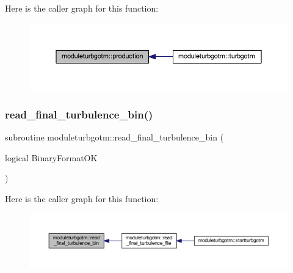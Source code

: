 Here is the caller graph for this function\+:\nopagebreak
\begin{figure}[H]
\begin{center}
\leavevmode
\includegraphics[width=350pt]{namespacemoduleturbgotm_a67c6b885be20c57ed033df6706d9adab_icgraph}
\end{center}
\end{figure}
\mbox{\label{namespacemoduleturbgotm_ad942836f5c266b4ce7d03ca96fdf696a}} 
\subsubsection{\texorpdfstring{read\+\_\+final\+\_\+turbulence\+\_\+bin()}{read\_final\_turbulence\_bin()}}
{\footnotesize\ttfamily subroutine moduleturbgotm\+::read\+\_\+final\+\_\+turbulence\+\_\+bin (\begin{DoxyParamCaption}\item[{logical}]{Binary\+Format\+OK }\end{DoxyParamCaption})\hspace{0.3cm}{\ttfamily [private]}}

Here is the caller graph for this function\+:\nopagebreak
\begin{figure}[H]
\begin{center}
\leavevmode
\includegraphics[width=350pt]{namespacemoduleturbgotm_ad942836f5c266b4ce7d03ca96fdf696a_icgraph}
\end{center}
\end{figure}
\mbox{\label{namespacemoduleturbgotm_afb5ea6833bc3fb9e5ef6bc373e92a305}} 
